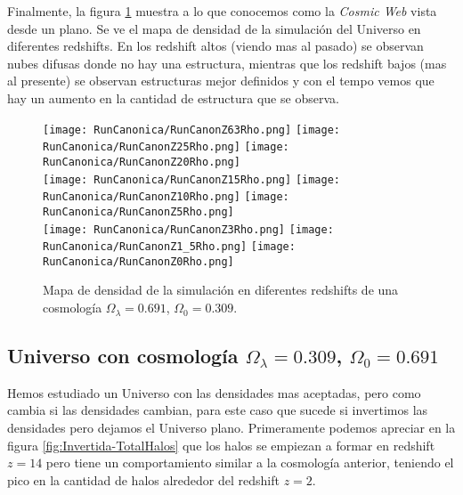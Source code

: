 Finalmente, la figura \ref{fig:CanonRunDensityMap} muestra a lo que conocemos como la \emph{Cosmic Web} vista desde un plano. Se ve el mapa de densidad de la simulación del Universo en diferentes redshifts. En los redshift altos (viendo mas al pasado) se observan nubes difusas donde no hay una estructura, mientras que los redshift bajos (mas al presente) se observan estructuras mejor definidos y con el tempo vemos que hay un aumento en la cantidad de estructura que se observa.

\begin{figure}[H]
    \centering

    \texttt{[image: RunCanonica/RunCanonZ63Rho.png]}   %
    \texttt{[image: RunCanonica/RunCanonZ25Rho.png]}   %
    \texttt{[image: RunCanonica/RunCanonZ20Rho.png]}   %
    \\
    \texttt{[image: RunCanonica/RunCanonZ15Rho.png]}   %
    \texttt{[image: RunCanonica/RunCanonZ10Rho.png]}   %
    \texttt{[image: RunCanonica/RunCanonZ5Rho.png]}    %
    \\
    \texttt{[image: RunCanonica/RunCanonZ3Rho.png]}    %
    \texttt{[image: RunCanonica/RunCanonZ1\_5Rho.png]}  %
    \texttt{[image: RunCanonica/RunCanonZ0Rho.png]}    %
    \caption[Mapa de densidad de un Universo $\Omega_\lambda = 0.691 $, $\Omega_0 = 0.309$ en en diferentes redshift]{ \footnotesize Mapa de densidad de la simulación en diferentes redshifts de una cosmología $\Omega_\lambda = 0.691 $, $\Omega_0 = 0.309$. }
    \label{fig:CanonRunDensityMap}
\end{figure}

\subsection{Universo con cosmología  \texorpdfstring{$\Omega_\lambda = 0.309$, $\Omega_0 = 0.691$ }{Omega lambda = 0.309, Omega 0 = 0.691} }
Hemos estudiado un Universo con las densidades mas aceptadas, pero como cambia si las densidades cambian, para este caso que sucede si invertimos las densidades pero dejamos el Universo plano. Primeramente podemos apreciar en la figura \ref{fig:Invertida-TotalHalos} que los halos se empiezan a formar en redshift $z=14$ pero tiene un comportamiento similar a la cosmología anterior, teniendo el pico en la cantidad de halos alrededor del redshift $z=2$. 

